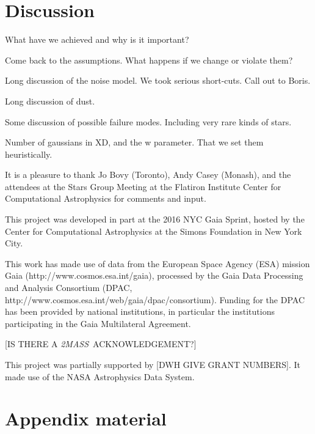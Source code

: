\documentclass[12pt, preprint]{aastex6}
\newcommand{\acronym}[1]{{\small{#1}}}
\newcommand{\project}[1]{\textsl{#1}}
\newcommand{\tmass}{\project{\acronym{2MASS}}}
\begin{document}
\section{Discussion}
What have we achieved and why is it important?

Come back to the assumptions. What happens if we change or violate them?

Long discussion of the noise model. We took serious short-cuts. Call out to Boris.

Long discussion of dust.

Some discussion of possible failure modes. Including very rare kinds of stars.

Number of gaussians in XD, and the w parameter. That we set them heuristically.


\acknowledgments It is a pleasure to thank
  Jo Bovy (Toronto),
  Andy Casey (Monash),
and the attendees at the Stars Group Meeting at the Flatiron Institute
Center for Computational Astrophysics for comments and input.

This project was developed in part at the 2016 \acronym{NYC} Gaia Sprint, hosted
by the Center for Computational Astrophysics at the Simons Foundation
in New York City.

This work has made use of data from the European Space Agency (\acronym{ESA})
mission Gaia (http://www.cosmos.esa.int/gaia), processed by the Gaia
Data Processing and Analysis Consortium (\acronym{DPAC},
http://www.cosmos.esa.int/web/gaia/dpac/consortium). Funding for the
\acronym{DPAC} has been provided by national institutions, in particular the
institutions participating in the Gaia Multilateral Agreement.

[IS THERE A \tmass\ ACKNOWLEDGEMENT?]

This project was partially supported by [DWH GIVE GRANT NUMBERS]. It
made use of the \acronym{NASA} Astrophysics Data System.

\appendix

\section{Appendix material}



\clearpage
\end{document}
